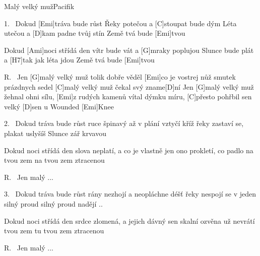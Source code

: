 \begin{song}{Malý velký muž}{Pacifik}


\begin{xverse}{1.~}
Dokud [\large Emi]tráva bude růst
Řeky potečou a [\large C]stoupat bude dým
Léta utečou a [\large D]kam padne tvůj stín
Země tvá bude [\large Emi]tvou

Dokud [\large Ami]noci střídá den
vítr bude vát a [\large G]mraky poplujou
Slunce bude plát a [\large H7]tak jak léta jdou
Země tvá bude [\large Emi]tvou
\end{xverse}


\begin{xverse}{R.~}
Jen [\large G]malý velký muž
tolik dobře věděl [\large Emi]co je vostrej nůž
smutek prázdnych sedel
[\large C]malý velký muž čekal svý zname[\large D]ní
Jen [\large G]malý velký muž
žehnal ohni sílu, [\large Emi]z rudých kamenů
vítal dýmku míru, [\large C]přesto pohřbil sen
velký [\large D]sen u Wounded [\large Emi]Knee
\end{xverse}


\begin{xverse}{2.~}
Dokud tráva bude růst
ruce špinavý až v plání vztyčí kříž
řeky zastaví se, plakat uslyšíš
Slunce zář krvavou

Dokud noci střídá den
slova neplatí, a co je vlastně jen
ono prokletí, co padlo na tvou zem
na tvou zem ztracenou
\end{xverse}


\begin{xverse}{R.~}
Jen malý ...
\end{xverse}

\begin{xverse}{3.~}
Dokud tráva bude růst
rány nezhojí a neopláchne déšť
řeky nespojí se v jeden silný proud
silný proud nadějí ..

Dokud noci střídá den
srdce zlomená, a jejich dávný sen
skalní ozvěna už nevrátí tvou zem
tu tvou zem ztracenou
\end{xverse}

\begin{xverse}{R.~}
Jen malý ...
\end{xverse}
\end{song}

